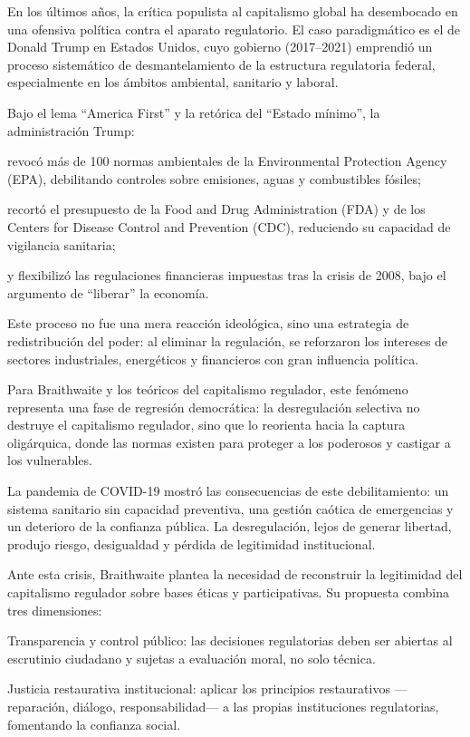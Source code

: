 \documentclass[
  spanish,
  letterpaper,
  DIV=11,
  numbers=noendperiod]{scrreprt}
\begin{document}
En los últimos años, la crítica populista al capitalismo global ha
desembocado en una ofensiva política contra el aparato regulatorio. El
caso paradigmático es el de Donald Trump en Estados Unidos, cuyo
gobierno (2017--2021) emprendió un proceso sistemático de
desmantelamiento de la estructura regulatoria federal, especialmente en
los ámbitos ambiental, sanitario y laboral.

Bajo el lema ``America First'' y la retórica del ``Estado mínimo'', la
administración Trump:

revocó más de 100 normas ambientales de la Environmental Protection
Agency (EPA), debilitando controles sobre emisiones, aguas y
combustibles fósiles;

recortó el presupuesto de la Food and Drug Administration (FDA) y de los
Centers for Disease Control and Prevention (CDC), reduciendo su
capacidad de vigilancia sanitaria;

y flexibilizó las regulaciones financieras impuestas tras la crisis de
2008, bajo el argumento de ``liberar'' la economía.

Este proceso no fue una mera reacción ideológica, sino una estrategia de
redistribución del poder: al eliminar la regulación, se reforzaron los
intereses de sectores industriales, energéticos y financieros con gran
influencia política.

Para Braithwaite y los teóricos del capitalismo regulador, este fenómeno
representa una fase de regresión democrática: la desregulación selectiva
no destruye el capitalismo regulador, sino que lo reorienta hacia la
captura oligárquica, donde las normas existen para proteger a los
poderosos y castigar a los vulnerables.

La pandemia de COVID-19 mostró las consecuencias de este debilitamiento:
un sistema sanitario sin capacidad preventiva, una gestión caótica de
emergencias y un deterioro de la confianza pública. La desregulación,
lejos de generar libertad, produjo riesgo, desigualdad y pérdida de
legitimidad institucional.

Ante esta crisis, Braithwaite plantea la necesidad de reconstruir la
legitimidad del capitalismo regulador sobre bases éticas y
participativas. Su propuesta combina tres dimensiones:

Transparencia y control público: las decisiones regulatorias deben ser
abiertas al escrutinio ciudadano y sujetas a evaluación moral, no solo
técnica.

Justicia restaurativa institucional: aplicar los principios
restaurativos ---reparación, diálogo, responsabilidad--- a las propias
instituciones regulatorias, fomentando la confianza social.
\end{document}
